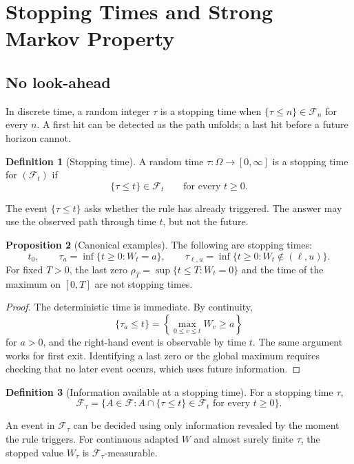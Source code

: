 \documentclass[10pt]{article}
\newcommand{\1}{\mathbf 1}
\newcommand{\cF}{\mathcal F}
\theoremstyle{definition}
\newtheorem{definition}{Definition}[section]
\newtheorem{proposition}[definition]{Proposition}
\begin{document}
\section{Stopping Times and Strong Markov Property}

\subsection{No look-ahead}

In discrete time, a random integer \(\tau\) is a stopping time when
\(\{\tau\leq n\}\in\cF_n\) for every \(n\). A first hit can be detected as
the path unfolds; a last hit before a future horizon cannot.

\begin{definition}[Stopping time]
A random time \(\tau:\Omega\to[0,\infty]\) is a stopping time for
\((\cF_t)\) if
\[
\{\tau\leq t\}\in\cF_t
\qquad\text{for every }t\geq0.
\]
\end{definition}

The event \(\{\tau\leq t\}\) asks whether the rule has already triggered.
The answer may use the observed path through time \(t\), but not the future.

\begin{proposition}[Canonical examples]
The following are stopping times:
\[
t_0,
\qquad
\tau_a=\inf\{t\geq0:W_t=a\},
\qquad
\tau_{\ell,u}=\inf\{t\geq0:W_t\notin(\ell,u)\}.
\]
For fixed \(T>0\), the last zero
\(\rho_T=\sup\{t\leq T:W_t=0\}\) and the time of the maximum on \([0,T]\)
are not stopping times.
\end{proposition}

\begin{proof}
The deterministic time is immediate. By continuity,
\[
\{\tau_a\leq t\}
=\left\{\max_{0\leq v\leq t}W_v\geq a\right\}
\]
for \(a>0\), and the right-hand event is observable by time \(t\). The same
argument works for first exit. Identifying a last zero or the global maximum
requires checking that no later event occurs, which uses future information.
\end{proof}

\begin{definition}[Information available at a stopping time]
For a stopping time \(\tau\),
\[
\cF_\tau
=\{A\in\cF:A\cap\{\tau\leq t\}\in\cF_t
\text{ for every }t\geq0\}.
\]
\end{definition}

An event in \(\cF_\tau\) can be decided using only information revealed by
the moment the rule triggers. For continuous adapted \(W\) and almost surely
finite \(\tau\), the stopped value \(W_\tau\) is \(\cF_\tau\)-measurable.
\end{document}
